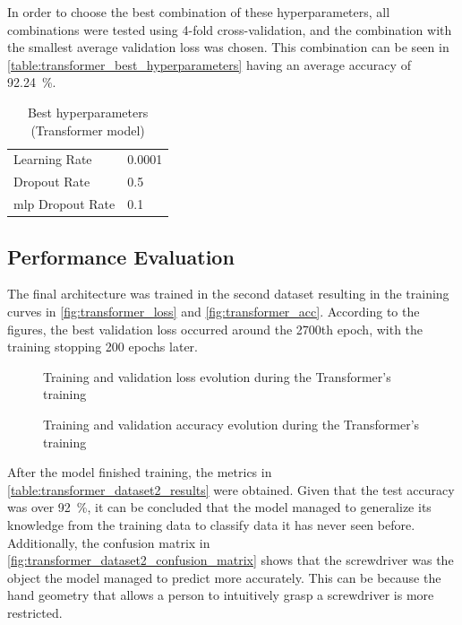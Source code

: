 In order to choose the best combination of these hyperparameters, all combinations were tested using 4-fold cross-validation, and the combination with the smallest average validation loss was chosen. This combination can be seen in \autoref{table:transformer_best_hyperparameters} having an average accuracy of \SI{92.24}{\percent}.

\begin{table}[ht]
    \centering
    \caption{Best hyperparameters (Transformer model)}
    \label{table:transformer_best_hyperparameters}
    \begin{tabular}{ll}
        \toprule
        Learning Rate & 0.0001 \\
        Dropout Rate & 0.5 \\
        \acs{mlp} Dropout Rate & 0.1 \\
        \bottomrule
    \end{tabular}
\end{table}

\subsection{Performance Evaluation}

The final architecture was trained in the second dataset resulting in the training curves in \autoref{fig:transformer_loss} and \autoref{fig:transformer_acc}. According to the figures, the best validation loss occurred around the 2700th epoch, with the training stopping 200 epochs later.

\begin{figure}[ht]
    \centering
    {\fontsize{10}{12}\selectfont}
    \caption{Training and validation loss evolution during the Transformer's training}
    \label{fig:transformer_loss}
\end{figure}

\begin{figure}[ht]
    \centering
    {\fontsize{10}{12}\selectfont}
    \caption{Training and validation accuracy evolution during the Transformer's training}
    \label{fig:transformer_acc}
\end{figure}

After the model finished training, the metrics in \autoref{table:transformer_dataset2_results} were obtained. Given that the test accuracy was over \SI{92}{\percent}, it can be concluded that the model managed to generalize its knowledge from the training data to classify data it has never seen before. Additionally, the confusion matrix in \autoref{fig:transformer_dataset2_confusion_matrix} shows that the screwdriver was the object the model managed to predict more accurately. This can be because the hand geometry that allows a person to intuitively grasp a screwdriver is more restricted.

